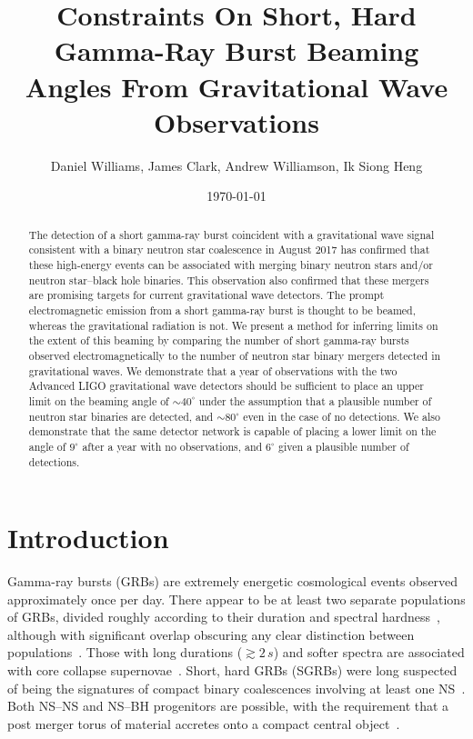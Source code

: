 \documentclass[twocolumn,nofootinbib]{revtex4-1}
\newcommand{\BNS}{\ac{NS}--\ac{NS}\xspace}
\newcommand{\NSBH}{\ac{NS}--\ac{BH}\xspace}
\begin{document}
\title{Constraints On Short, Hard Gamma-Ray Burst Beaming Angles From
Gravitational Wave Observations}
\author{Daniel Williams, James Clark, Andrew Williamson, Ik Siong Heng}
\date{\today}

\begin{abstract}
The detection of a short gamma-ray burst coincident with a
gravitational wave signal consistent with a binary neutron star
coalescence in August 2017 has confirmed that these high-energy events
can be associated with merging binary neutron stars and/or neutron
star--black hole binaries. This observation also confirmed that these
mergers are promising targets for current gravitational wave
detectors. The prompt electromagnetic emission from a short gamma-ray
burst is thought to be beamed, whereas the gravitational radiation is
not. We present a method for inferring limits on the extent of this
beaming by comparing the number of short gamma-ray bursts observed
electromagnetically to the number of neutron star binary mergers
detected in gravitational waves. We demonstrate that a year of
observations with the two Advanced LIGO gravitational wave detectors
should be sufficient to place an upper limit on the beaming angle of
$\sim 40^{\circ}$ under the assumption that a plausible number of
neutron star binaries are detected, and $\sim 80^{\circ}$ even in the
case of no detections. We also demonstrate that the same detector
network is capable of placing a lower limit on the angle of
$9^{\circ}$ after a year with no observations, and $6^{\circ}$ given a
plausible number of detections.
\end{abstract}

\maketitle

\section{Introduction}

Gamma-ray bursts (GRBs) are extremely energetic cosmological events
observed approximately once per day. There appear to be at least two separate
populations of \acp{GRB}, divided roughly according to their duration and
spectral hardness~\cite{Kouveliotou:1993yx}, although with significant overlap
obscuring any clear distinction between
populations~\cite{Zhang:2009uf,Bromberg:2012gp}.
Those with long durations ($\gtrsim 2\,s$) and softer spectra are associated
with core collapse
supernovae~\cite{Galama:1998ea,MacFadyen:1998vz,Woosley:2006fn}. Short, hard
\acp{GRB} (SGRBs) were long suspected of being the signatures of
compact binary coalescences involving at least one
\ac{NS}~\cite{Blinnikov1984,Eichler:1989ve,Paczynski:1991aq,Narayan:1992iy,Lee:2007js}.
Both \BNS and \NSBH progenitors are possible, with the requirement that a post
merger torus of material accretes onto a compact central
object~\cite{Blandford:1977ds,Rosswog:2002rt,Giacomazzo:2012zt}.
\end{document}
